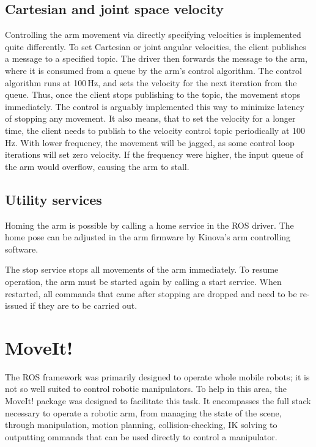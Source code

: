\documentclass[buriama8_dp.tex]{subfiles}
\begin{document}
\subsection{Cartesian and joint space velocity}
\label{subsec:api_cart_vel}

Controlling the arm movement via directly specifying velocities is implemented quite differently. To set Cartesian or joint angular velocities, the client publishes a message to a specified topic. The driver then forwards the message to the arm, where it is consumed from a queue by the arm's control algorithm. The control algorithm runs at 100\,Hz, and sets the velocity for the next iteration from the queue. Thus, once the client stops publishing to the topic, the movement stops immediately. The control is arguably implemented this way to minimize latency of stopping any movement. It also means, that to set the velocity for a longer time, the client needs to publish to the velocity control topic periodically at 100\,Hz. With lower frequency, the movement will be jagged, as some control loop iterations will set zero velocity. If the frequency were higher, the input queue of the arm would overflow, causing the arm to stall.

\subsection{Utility services}
\label{subsec:api_util}

Homing the arm is possible by calling a home service in the ROS driver. The home pose can be adjusted in the arm firmware by Kinova's arm controlling software.

The stop service stops all movements of the arm immediately. To resume operation, the arm must be started again by calling a start service. When restarted, all commands that came after stopping are dropped and need to be re-issued if they are to be carried out.

\section{MoveIt!}
\label{sec:moveit}

The ROS framework was primarily designed to operate whole mobile robots; it is not so well suited to control robotic manipulators. To help in this area, the MoveIt! package was designed to facilitate this task. It encompasses the full stack necessary to operate a robotic arm, from managing the state of the scene, through manipulation, motion planning, collision-checking, IK solving to outputting ommands that can be used directly to control a manipulator.
\end{document}
